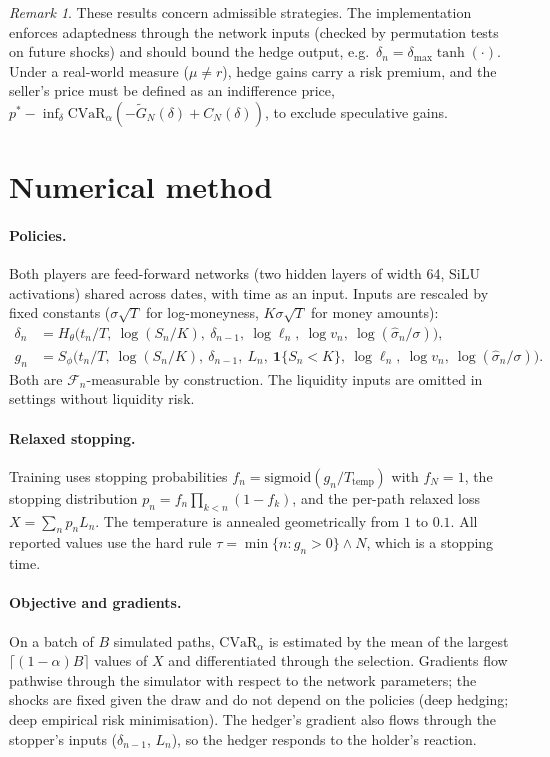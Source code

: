 \documentclass[11pt]{article}
\theoremstyle{definition}
\theoremstyle{remark}
\newtheorem{remark}{Remark}
\newcommand{\F}{\mathcal{F}}
\newcommand{\CVaR}{\mathrm{CVaR}}
\newcommand{\Gt}{\tilde G}
\begin{document}
\begin{remark}
These results concern admissible strategies. The implementation enforces adaptedness through the network
inputs (checked by permutation tests on future shocks) and should bound the hedge output, e.g.\
$\delta_n=\delta_{\max}\tanh(\cdot)$. Under a real-world measure ($\mu\neq r$), hedge gains carry a risk
premium, and the seller's price must be defined as an indifference price,
$p^*-\inf_\delta\CVaR_\alpha(-\Gt_N(\delta)+C_N(\delta))$, to exclude speculative gains.
\end{remark}

\section{Numerical method}\label{sec:method}

\paragraph{Policies.} Both players are feed-forward networks (two hidden layers of width 64, SiLU
activations) shared across dates, with time as an input. Inputs are rescaled by fixed constants
($\sigma\sqrt T$ for log-moneyness, $K\sigma\sqrt T$ for money amounts):
\begin{align*}
\delta_n&=H_\theta\big(t_n/T,\ \log(S_n/K),\ \delta_{n-1},\ \log\ell_n,\ \log v_n,\ \log(\hat\sigma_n/\sigma)\big),\\
g_n&=S_\phi\big(t_n/T,\ \log(S_n/K),\ \delta_{n-1},\ L_n,\ \mathbf 1\{S_n<K\},\ \log\ell_n,\ \log v_n,\ \log(\hat\sigma_n/\sigma)\big).
\end{align*}
Both are $\F_n$-measurable by construction. The liquidity inputs are omitted in settings without
liquidity risk.

\paragraph{Relaxed stopping.} Training uses stopping probabilities
$f_n=\mathrm{sigmoid}(g_n/T_{\mathrm{temp}})$ with $f_N=1$, the stopping distribution
$p_n=f_n\prod_{k<n}(1-f_k)$, and the per-path relaxed loss $X=\sum_n p_nL_n$. The temperature is annealed
geometrically from $1$ to $0.1$. All reported values use the hard rule
$\tau=\min\{n: g_n>0\}\wedge N$, which is a stopping time.

\paragraph{Objective and gradients.} On a batch of $B$ simulated paths, $\CVaR_\alpha$ is estimated by the
mean of the largest $\lceil(1-\alpha)B\rceil$ values of $X$ and differentiated through the selection.
Gradients flow pathwise through the simulator with respect to the network parameters; the shocks are
fixed given the draw and do not depend on the policies (deep hedging; deep empirical risk minimisation).
The hedger's gradient also flows through the stopper's inputs ($\delta_{n-1}$, $L_n$), so the hedger
responds to the holder's reaction.
\end{document}

